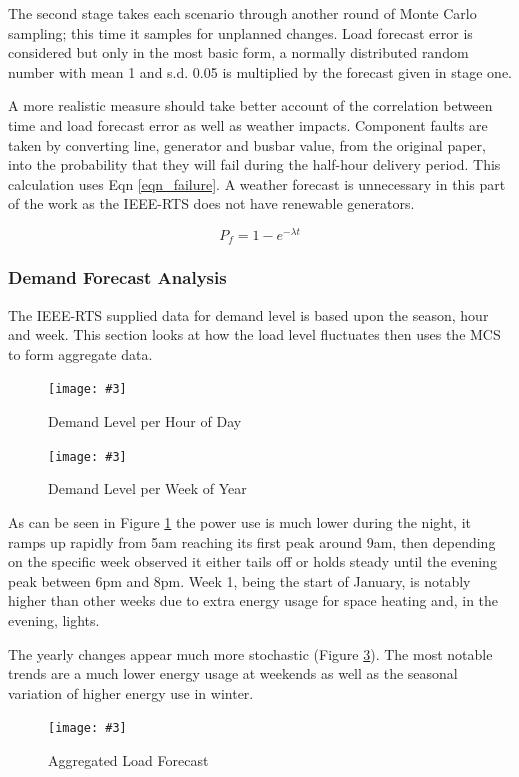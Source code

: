 \documentclass[a4paper,oneside,12pt]{report}
\newcommand{\image}[3] {
  \begin{figure}
    \begin{center}
      \texttt{[image: \#3]}
      \caption{#2}
      \label{#1}
    \end{center}
  \end{figure}
}
\begin{document}
The second stage takes each scenario through another round of Monte Carlo sampling; this time it samples for unplanned changes. Load forecast error is considered but only in the most basic form, a normally distributed random number with mean 1 and s.d. 0.05 is multiplied by the forecast given in stage one.

A more realistic measure should take better account of the correlation between time and load forecast error as well as weather impacts. Component faults are taken by converting line, generator and busbar value, from the original paper, into the probability that they will fail during the half-hour delivery period. This calculation uses Eqn \ref{eqn_failure}. A weather forecast is unnecessary in this part of the work as the IEEE-RTS does not have renewable generators.

\begin{equation}
  \label{eqn_failure}
  P_f = {1 - e^{- \lambda t}}
\end{equation}

\subsubsection{Demand Forecast Analysis}

The IEEE-RTS supplied data for demand level is based upon the season, hour and week. This section looks at how the load level fluctuates then uses the MCS to form aggregate data.

\image{forecastperhour}{Demand Level per Hour of Day}{forecastperhour.png}

\image{forecastperweek}{Demand Level per Week of Year}{forecastperweek.png}

As can be seen in Figure \ref{forecastperhour} the power use is much lower during the night, it ramps up rapidly from 5am reaching its first peak around 9am, then depending on the specific week observed it either tails off or holds steady until the evening peak between 6pm and 8pm. Week 1, being the start of January, is notably higher than other weeks due to extra energy usage for space heating and, in the evening, lights.

The yearly changes appear much more stochastic (Figure \ref{aggregateforecast}). The most notable trends are a much lower energy usage at weekends as well as the seasonal variation of higher energy use in winter.

\image{aggregateforecast}{Aggregated Load Forecast}{aggregateforecast.png}
\end{document}
